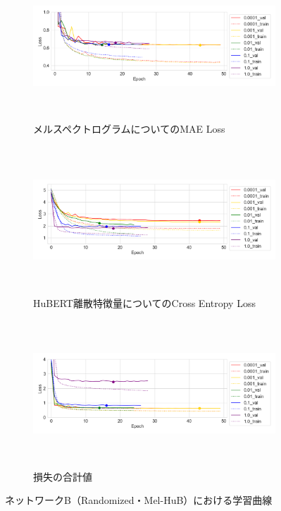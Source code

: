 \begin{figure}[bt]
    \centering
    \begin{subfigure}{\linewidth}
        \centering
        \includegraphics[height=55mm]{./figure/sec4/learning_curves/6/mel_loss.png}
        \caption{メルスペクトログラムについてのMAE Loss}
        \label{sec4:fig:learning_curve_method_6_val_mel_loss}
    \end{subfigure}
    \begin{subfigure}{\linewidth}
        \centering
        \includegraphics[height=55mm]{./figure/sec4/learning_curves/6/ssl_feature_cluster_loss.png}
        \caption{HuBERT離散特徴量についてのCross Entropy Loss}
        \label{sec4:fig:learning_curve_method_6_val_ssl_feature_cluster_loss}
    \end{subfigure}
    \begin{subfigure}{\linewidth}
        \centering
        \includegraphics[height=55mm]{./figure/sec4/learning_curves/6/total_loss.png}
        \caption{損失の合計値}
        \label{sec4:fig:learning_curve_method_6_val_total_loss}
    \end{subfigure}
    \caption{ネットワークB（Randomized・Mel-HuB）における学習曲線}
    \label{sec4:fig:learning_curve_method_6_val_losses}
\end{figure}

